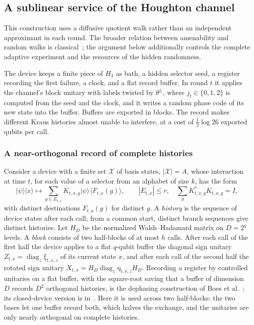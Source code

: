 \documentclass[11pt,a4paper]{article}
\theoremstyle{plain}
\theoremstyle{definition}
\theoremstyle{remark}
\DeclareMathOperator{\diag}{diag}
\begin{document}
\subsection{A sublinear service of the Houghton channel}\label{sec:sublinear}

This construction uses a diffusive quotient walk rather than an independent
approximant in each round. The broader relation between amenability and random
walks is classical~\cite{Kesten1959}; the argument below additionally controls
the complete adaptive experiment and the resources of the hidden randomness.

The device keeps a finite piece of $H_3$ as bath, a hidden selector seed, a register recording the first failure, a
clock, and a flat record buffer. In round $t$ it applies the channel's block unitary with labels twisted by $\theta^{j_t}$,
where $j_t\in\{0,1,2\}$ is computed from the seed and the clock, and it writes a random phase code of its new state into
the buffer. Buffers are exported in blocks. The record makes different Kraus histories almost unable to interfere, at a
cost of $\frac12\log26$ exported qubits per call.

\subsubsection{A near-orthogonal record of complete histories}

Consider a device with a finite set $\mathcal X$ of basis states, $|\mathcal X|=A$, whose interaction at time $t$, for each
value of a selector from an alphabet of size $k$, has the form
\begin{equation}\label{eq:branches}
|\psi\rangle|x\rangle\longmapsto\sum_{g\in E_{t,x}}K_{t,x,g}|\psi\rangle\,|F_{t,x}(g)\rangle,\qquad
|E_{t,x}|\le r,\quad\sum_gK_{t,x,g}^*K_{t,x,g}=I,
\end{equation}
with distinct destinations $F_{t,x}(g)$ for distinct $g$. A \emph{history} is the sequence of device states after each
call; from a common start, distinct branch sequences give distinct histories. Let $H_D$ be the normalized Walsh--Hadamard
matrix on $D=2^q$ levels. A \emph{block} consists of two half-blocks of at most $h$ calls. After each call of the first
half the device applies to a flat $q$-qubit buffer the diagonal sign unitary $Z_{t,x}=\diag_z\xi_{t,x,z}$ of its current
state $x$, and after each call of the second half the rotated sign unitary $X_{t,x}=H_D\diag_z\eta_{t,x,z}H_D$.
Recording a register by controlled unitaries on a flat buffer, with the square-root saving that a buffer of dimension $D$ records $D^2$
orthogonal histories, is the dephasing construction of Boes et al.~\cite[Lemma~1]{BoesWilming2018}; its closed-device version is
in~\cite[Section~7]{Douglas2026closed}. Here it is used across two half-blocks: the two bases let one buffer record both, which halves the
exchange, and the unitaries are only nearly orthogonal on complete histories.
\end{document}
